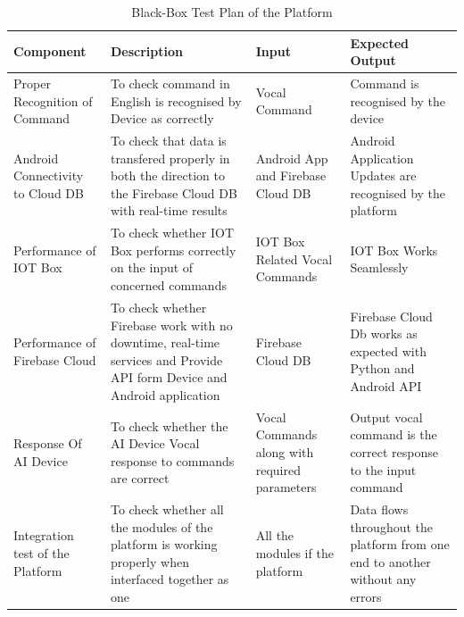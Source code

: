 \begin{itemize}
\begin{table}[ht]
    \caption{Black-Box Test Plan of the Platform}
    \begin{tabular}{ |p{4cm}|p{4cm}|p{3cm}|p{4cm}|  }
    \hline
    \textbf{Component} & \textbf{Description} & \textbf{Input} & \textbf{Expected Output}\\
    \hline
    Proper Recognition of Command & To check command in English is recognised by Device as correctly & Vocal Command & Command is recognised by the device \\\hline

    Android Connectivity to Cloud DB & To check that data is transfered properly in both the direction to the Firebase Cloud DB with real-time results & Android App and Firebase Cloud DB & Android Application Updates are recognised by the platform\\\hline
    
    Performance of IOT Box & To check whether IOT Box performs correctly on the input of concerned commands & IOT Box Related Vocal Commands & IOT Box Works Seamlessly\\\hline
    
    Performance of Firebase Cloud & To check whether Firebase work with no downtime, real-time services and Provide API form Device and Android application  & Firebase Cloud DB & Firebase Cloud Db works as expected with Python and Android API\\\hline
    
    Response Of AI Device & To check whether the AI Device Vocal response to commands are correct & Vocal Commands along with required parameters & Output vocal command is the correct response to the input command\\\hline
    
    Integration test of the Platform & To check whether all the modules of the platform is working properly when interfaced together as one & All the modules if the platform & Data flows throughout the platform from one end to another without any errors\\
 
    \hline
    \end{tabular}
\end{table}
\end{itemize}





 
